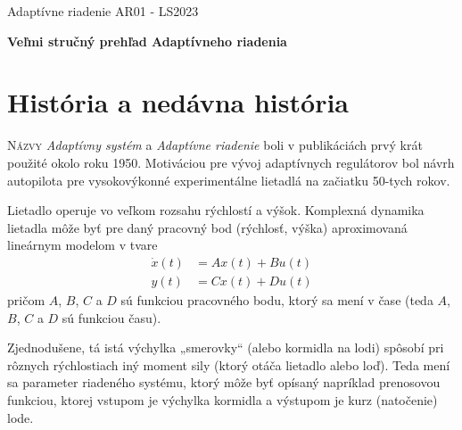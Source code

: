 \documentclass[a4paper, 10pt, ]{article}
\def\oznacenieCasti{AR01 - LS2023}
\begin{document}
\lstset{style=mystyle}




\fontsize{12pt}{22pt}\selectfont

\centerline{\textsf{Adaptívne riadenie} \hfill \textsf{\oznacenieCasti}}

\fontsize{18pt}{22pt}\selectfont






\begin{flushleft}
	\textbf{\textsf{Veľmi stručný prehľad Adaptívneho riadenia}}
\end{flushleft}





\normalsize

\bigskip

{\hypersetup{hidelinks}

\tableofcontents

}

\bigskip

\vspace{18pt}




\section{História a nedávna história}




\lettrine[lines=3, nindent=0pt]N{ázvy} \emph{Adaptívny systém} a \emph{Adaptívne riadenie} boli v publikáciách prvý krát použité okolo roku 1950. Motiváciou pre vývoj adaptívnych regulátorov bol návrh autopilota pre vysokovýkonné experimentálne lietadlá na začiatku 50-tych rokov.

Lietadlo operuje vo veľkom rozsahu rýchlostí a výšok. Komplexná dynamika lietadla môže byť pre daný pracovný bod (rýchlosť, výška) aproximovaná lineárnym modelom v tvare
\begin{subequations}
\begin{align}
	\dot{x}(t) &= A x(t) + B u(t)  \\
	y(t) &= C x(t) + D u(t)
\end{align}
\end{subequations}
pričom $A$, $B$, $C$ a $D$ sú funkciou pracovného bodu, ktorý sa mení v čase (teda $A$, $B$, $C$ a $D$ sú funkciou času).

Zjednodušene, tá istá výchylka „smerovky“ (alebo kormidla na lodi) spôsobí pri rôznych rýchlostiach iný moment sily (ktorý otáča lietadlo alebo loď). Teda mení sa parameter riadeného systému, ktorý môže byť opísaný napríklad prenosovou funkciou, ktorej vstupom je výchylka kormidla a výstupom je kurz (natočenie) lode.
\end{document}
